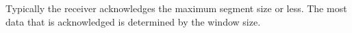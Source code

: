 Typically the receiver acknowledges the maximum segment size or less. The most data that is acknowledged is determined by the window size.